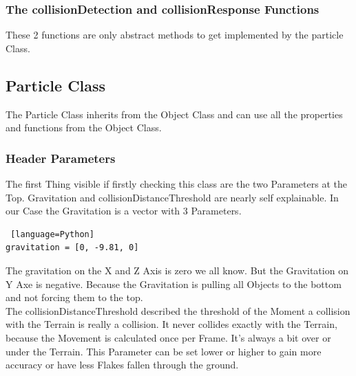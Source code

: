 \documentclass{sig-alternate-05-2015}
\begin{document}
\subsubsection{The collisionDetection and collisionResponse Functions}
These 2 functions are only abstract methods to get implemented by the particle Class.\\
\subsection{Particle Class}
The Particle Class inherits from the Object Class and can use all the properties and functions from the Object Class.
\subsubsection{Header Parameters}
The first Thing visible if firstly checking this class are the two Parameters at the Top. Gravitation and collisionDistanceThreshold are nearly self explainable. In our Case the Gravitation is a vector with 3 Parameters. \\
\begin{lstlisting} [language=Python]
gravitation = [0, -9.81, 0]
\end{lstlisting}
The gravitation on the X and Z Axis is zero we all know. But the Gravitation on Y Axe is negative. Because the Gravitation is pulling all Objects to the bottom and not forcing them to the top. \\
The collisionDistanceThreshold described the threshold of the Moment a collision with the Terrain is really a collision. It never collides exactly with the Terrain, because the Movement is calculated once per Frame. It’s always a bit over or under the Terrain. This Parameter can be set lower or higher to gain more accuracy or have less Flakes fallen through the ground.\\
\end{document}
